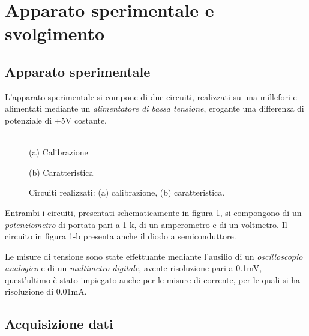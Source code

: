 \documentclass[@MAIN@]{subfiles}
\begin{document}
    \section{Apparato sperimentale e svolgimento} \label{sec:acquisizione}

    \subsection{Apparato sperimentale}\label{subsec:apparato-sperimentale}
    L'apparato sperimentale si compone di due circuiti, realizzati su una millefori
    e alimentati mediante un \textit{alimentatore di bassa tensione},
    erogante una differenza di potenziale di +5V costante.
    \\ \\
    \begin{figure}[ht]
        \centering
        \begin{minipage}[b]{0.4\textwidth}
            \centering
            
            \caption*{(a) Calibrazione}


        \end{minipage}
        \hfill
        \begin{minipage}[b]{0.55\textwidth}
            \centering
            
            \caption*{(b) Caratteristica}
        \end{minipage}
        \caption{Circuiti realizzati: (a) calibrazione, (b) caratteristica.}
        \label{fig:figura_circuiti}
    \end{figure}

    \newpage
    Entrambi i circuiti, presentati schematicamente in figura 1, si compongono di
    un \textit{potenziometro} di portata pari a 1 k\textohm, di un amperometro e
    di un voltmetro.
    Il circuito in figura 1-b presenta anche il diodo a semiconduttore.

    Le misure di tensione sono state effettuante mediante l'ausilio di un
    \textit{oscilloscopio analogico} e di un \textit{multimetro digitale}, avente
    risoluzione pari a 0.1mV, quest'ultimo è stato impiegato anche per le misure
    di corrente, per le quali si ha risoluzione di 0.01mA.

    \subsection{Acquisizione dati}\label{subsec:acquisizione-dati}
\end{document}
